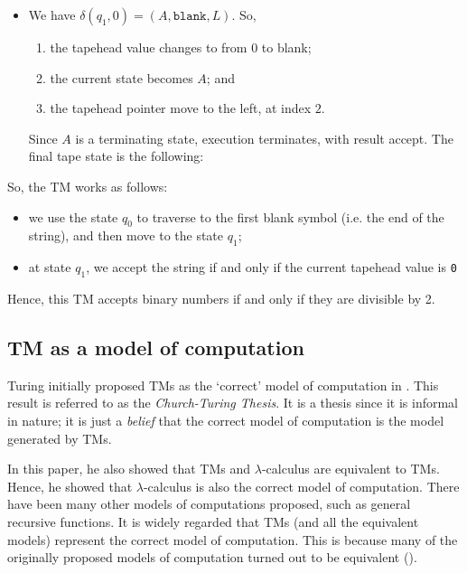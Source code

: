 \begin{itemize}
    \item We have $\delta(q_1, 0) = (A, \texttt{blank}, L)$. So, 
    \begin{enumerate}
        \item the tapehead value changes to from $0$ to blank;
        \item the current state becomes $A$; and
        \item the tapehead pointer move to the left, at index $2$.
    \end{enumerate}
    Since $A$ is a terminating state, execution terminates, with result accept. The final tape state is the following:
    \begin{figure}[H]
        \centering
    \end{figure}
\end{itemize}
So, the TM works as follows:
\begin{itemize}
    \item we use the state $q_0$ to traverse to the first blank symbol (i.e. the end of the string), and then move to the state $q_1$;
    \item at state $q_1$, we accept the string if and only if the current tapehead value is \texttt{0}
\end{itemize}
Hence, this TM accepts binary numbers if and only if they are divisible by 2.

\subsection{TM as a model of computation}
Turing initially proposed TMs as the `correct' model of computation in \cite{turing1936computable}. This result is referred to as the \emph{Church-Turing Thesis}. It is a thesis since it is informal in nature; it is just a \textit{belief} that the correct model of computation is the model generated by TMs. 

In this paper, he also showed that TMs and $\lambda$-calculus are equivalent to TMs. Hence, he showed that $\lambda$-calculus is also the correct model of computation. There have been many other models of computations proposed, such as general recursive functions. It is widely regarded that TMs (and all the equivalent models) represent the correct model of computation. This is because many of the originally proposed models of computation turned out to be equivalent (\cite{copeland2004essential}).

